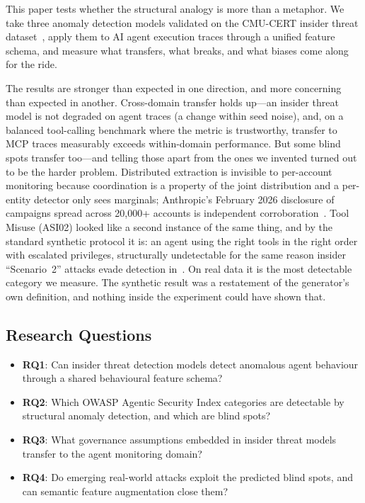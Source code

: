 \documentclass[conference]{IEEEtran}
\newcommand{\RQ}[1]{\textbf{RQ#1}}
\begin{document}
This paper tests whether the structural analogy is more than a metaphor. We take three anomaly detection models validated on the CMU-CERT insider threat dataset~\cite{rimal2026insider}, apply them to AI agent execution traces through a unified feature schema, and measure what transfers, what breaks, and what biases come along for the ride.

The results are stronger than expected in one direction, and more concerning than expected in another. Cross-domain transfer holds up---an insider threat model is not degraded on agent traces (a change within seed noise), and, on a balanced tool-calling benchmark where the metric is trustworthy, transfer to MCP traces measurably exceeds within-domain performance. But some blind spots transfer too---and telling those apart from the ones we invented turned out to be the harder problem. Distributed extraction is invisible to per-account monitoring because coordination is a property of the joint distribution and a per-entity detector only sees marginals; Anthropic's February 2026 disclosure of campaigns spread across 20,000+ accounts is independent corroboration~\cite{anthropic2026distillation}. Tool Misuse (ASI02) looked like a second instance of the same thing, and by the standard synthetic protocol it is: an agent using the right tools in the right order with escalated privileges, structurally undetectable for the same reason insider ``Scenario~2'' attacks evade detection in~\cite{rimal2026insider}. On real data it is the most detectable category we measure. The synthetic result was a restatement of the generator's own definition, and nothing inside the experiment could have shown that.

\subsection{Research Questions}

\begin{itemize}
    \item \RQ{1}: Can insider threat detection models detect anomalous agent behaviour through a shared behavioural feature schema?
    \item \RQ{2}: Which OWASP Agentic Security Index categories are detectable by structural anomaly detection, and which are blind spots?
    \item \RQ{3}: What governance assumptions embedded in insider threat models transfer to the agent monitoring domain?
    \item \RQ{4}: Do emerging real-world attacks exploit the predicted blind spots, and can semantic feature augmentation close them?
\end{itemize}
\end{document}
